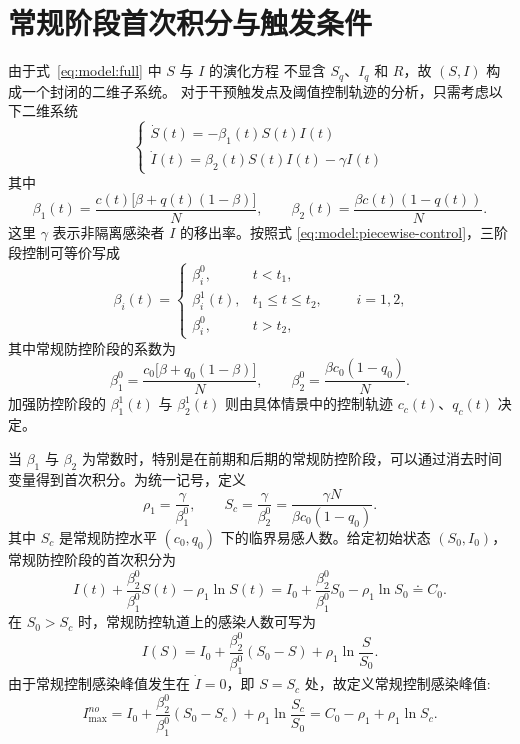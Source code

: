 \documentclass[lang=cn,a4paper,newtx]{elegantpaper}
\numberwithin{equation}{section}
\theoremstyle{plain}
\begin{document}
\section{常规阶段首次积分与触发条件}
由于式~\eqref{eq:model:full} 中 $S$ 与 $I$ 的演化方程
不显含 $S_q$、$I_q$ 和 $R$，故 $(S,I)$ 构成一个封闭的二维子系统。
对于干预触发点及阈值控制轨迹的分析，只需考虑以下二维系统
\begin{equation}
\begin{cases}
\dot{S}(t) = - \beta_1(t) S(t) I(t) \\
\dot{I}(t) =   \beta_2(t) S(t) I(t) - \gamma I(t)
\end{cases}
\label{eq:model:reduced-si}
\end{equation}
其中
\begin{equation}
\beta_1(t)=\frac{c(t)\big[\beta+q(t)(1-\beta)\big]}{N},
\qquad
\beta_2(t)=\frac{\beta c(t)(1-q(t))}{N}.
\label{eq:model:beta12-general}
\end{equation}
这里 $\gamma$ 表示非隔离感染者 $I$ 的移出率。按照式 \eqref{eq:model:piecewise-control}，三阶段控制可等价写成
\begin{equation}
\beta_i(t)=
\begin{cases}
\beta_i^0, & t<t_1,\\
\beta_i^1(t), & t_1\le t\le t_2,\\
\beta_i^0, & t>t_2,
\end{cases}
\qquad i=1,2,
\end{equation}
其中常规防控阶段的系数为
\begin{equation}
\beta_1^0=\frac{c_0\big[\beta+q_0(1-\beta)\big]}{N},
\qquad
\beta_2^0=\frac{\beta c_0(1-q_0)}{N}.
\label{eq:model:beta12-baseline}
\end{equation}
加强防控阶段的 $\beta_1^1(t)$ 与 $\beta_2^1(t)$ 则由具体情景中的控制轨迹 $c_c(t)$、$q_c(t)$ 决定。

当 $\beta_1$ 与 $\beta_2$ 为常数时，特别是在前期和后期的常规防控阶段，可以通过消去时间变量得到首次积分。为统一记号，定义
\begin{equation}
\rho_1=\frac{\gamma}{\beta_1^0},
\qquad
S_c=\frac{\gamma}{\beta_2^0}
=\frac{\gamma N}{\beta c_0(1-q_0)}.
\label{eq:model:baseline-symbols}
\end{equation}
其中 $S_c$ 是常规防控水平 $(c_0,q_0)$ 下的临界易感人数。给定初始状态 $(S_0,I_0)$，常规防控阶段的首次积分为
\begin{equation}
I(t)+\frac{\beta_2^0}{\beta_1^0} S(t)-\rho_1\ln S(t)
=
I_0+\frac{\beta_2^0}{\beta_1^0} S_0-\rho_1\ln S_0
\doteq C_0.
\label{eq:model:first-integral}
\end{equation}
在 $S_0>S_c$ 时，常规防控轨道上的感染人数可写为
\begin{equation*}
I(S)=I_0+\frac{\beta_2^0}{\beta_1^0}(S_0-S)
+\rho_1\ln\frac{S}{S_0}.
\end{equation*}
由于常规控制感染峰值发生在 $\dot I=0$，即 $S=S_c$ 处，故定义常规控制感染峰值:
\begin{equation}
I_{\max}^{no}
=
I_0+\frac{\beta_2^0}{\beta_1^0}(S_0-S_c)
+\rho_1\ln\frac{S_c}{S_0}=C_0-\rho_1+\rho_1\ln S_c.
\label{eq:s1:Imax-no}
\end{equation}
\end{document}
